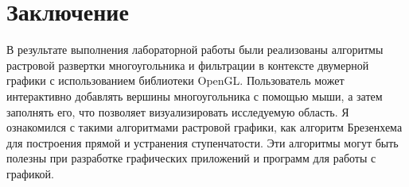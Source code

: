 \documentclass[a4paper, 14pt]{extarticle}
\begin{document}
\section{Заключение}
В результате выполнения лабораторной работы были реализованы алгоритмы растровой развертки многоугольника и фильтрации в контексте двумерной графики с использованием библиотеки OpenGL. Пользователь может интерактивно добавлять вершины многоугольника с помощью мыши, а затем заполнять его, что позволяет визуализировать исследуемую область. Я ознакомился с такими алгоритмами растровой графики, как алгоритм Брезенхема для построения прямой и устранения ступенчатости. Эти алгоритмы могут быть полезны при разработке графических приложений и программ для работы с графикой.
\end{document}

